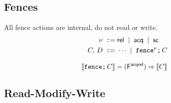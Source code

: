 \subsection{Fences}

All fence actions are internal, do not read or write.
\begin{align*}
  \fmode \BNFDEF& \modeREL \BNFSEP \modeACQ \BNFSEP \modeSC
  \\
  \aCmd,\,\bCmd
  \BNFDEF& \cdots
  \BNFSEP \FENCE^{\fmode} \SEMI \aCmd  
\end{align*}

\begin{align*}
  \sem{\FENCE\SEMI \aCmd} & =
  (\DF{}) \prefix \sem{\aCmd}
\end{align*}

\subsection{Read-Modify-Write}



